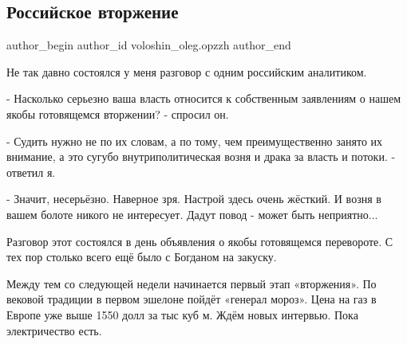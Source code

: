  
 
 
 
 
 
\subsection{Российское вторжение}
\label{sec:15_12_2021.fb.voloshin_oleg.opzzh.1.vtorzhenie_rossia}
 
\ifcmt
 author_begin
   author_id voloshin_oleg.opzzh
 author_end
\fi


Не так давно состоялся у меня разговор с одним российским аналитиком.

- Насколько серьезно ваша власть относится к собственным заявлениям о нашем
якобы готовящемся вторжении? - спросил он.

- Судить нужно не по их словам, а по тому, чем преимущественно занято их
внимание, а это сугубо внутриполитическая возня и драка за власть и потоки. -
ответил я.

- Значит, несерьёзно. Наверное зря. Настрой здесь очень жёсткий. И возня в
вашем болоте никого не интересует. Дадут повод - может быть неприятно...

Разговор этот состоялся в день объявления о якобы готовящемся перевороте. С тех
пор столько всего ещё было с Богданом на закуску. 

Между тем со следующей недели начинается первый этап «вторжения». По вековой
традиции в первом эшелоне пойдёт «генерал мороз». Цена на газ в Европе уже выше
1550 долл за тыс куб м. Ждём новых интервью. Пока электричество есть.

